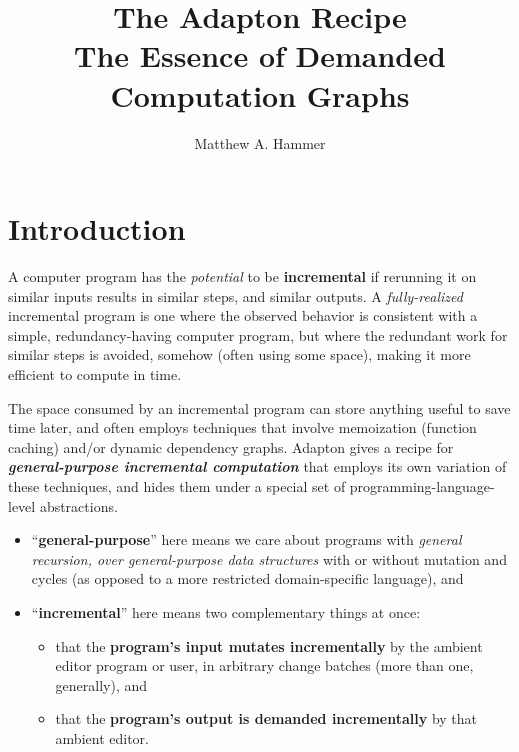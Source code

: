 \documentclass[11pt]{article}
\begin{document}
\author{Matthew A. Hammer}
\title{The Adapton Recipe
  \\
  \small The Essence of Demanded Computation Graphs
}

\maketitle

\linenumbers

\section{Introduction}

A computer program has the \emph{potential} to be \textbf{incremental} if
rerunning it on similar inputs results in similar steps, and similar
outputs.
%
A \emph{fully-realized} incremental program is one where the observed
behavior is consistent with a simple, redundancy-having computer program,
but where the redundant work for similar steps is
avoided, somehow (often using some space), making it more efficient to compute in time.

The space consumed by an incremental program can store anything useful
to save time later, and often employs techniques that involve
memoization (function caching) and/or dynamic dependency graphs.
%
Adapton gives a recipe for \textbf{\emph{general-purpose incremental
  computation}} that employs its own variation of these techniques,
and hides them under a special set of programming-language-level
abstractions.
%
\begin{itemize}
\item ``\textbf{general-purpose}'' here means we care about programs
  with \emph{general recursion, over general-purpose data structures}
  with or without mutation and cycles (as opposed to a more restricted
  domain-specific language), and
  
\item ``\textbf{incremental}'' here means two complementary things at once:
  \begin {itemize}

  \item that the \textbf{program's input mutates incrementally} by the
    ambient editor program or user, in arbitrary change batches (more than one, generally), and 
    
  \item that the \textbf{program's output is demanded incrementally}
    by that ambient editor.
  \end{itemize}
\end{itemize}
\end{document}
